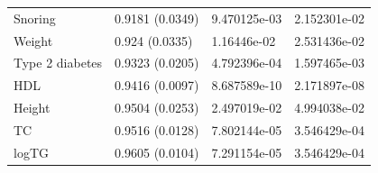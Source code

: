 \begin{table}[ht]
\begin{tabular}{llll}
  Snoring & 0.9181 (0.0349) & 9.470125e-03 & 2.152301e-02 \\ 
  Weight  & 0.924 (0.0335) & 1.16446e-02 & 2.531436e-02 \\ 
  Type 2 diabetes & 0.9323 (0.0205) & 4.792396e-04 & 1.597465e-03 \\ 
  HDL & 0.9416 (0.0097) & 8.687589e-10 & 2.171897e-08 \\ 
  Height  & 0.9504 (0.0253) & 2.497019e-02 & 4.994038e-02 \\ 
  TC & 0.9516 (0.0128) & 7.802144e-05 & 3.546429e-04 \\ 
  logTG & 0.9605 (0.0104) & 7.291154e-05 & 3.546429e-04 \\ 
   \hline
\end{tabular}
\end{table}

